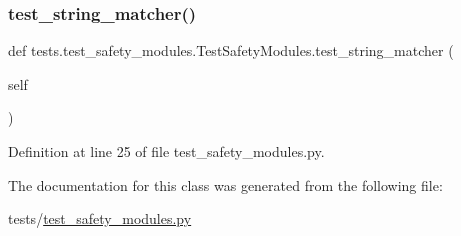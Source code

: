 \mbox{\label{classtests_1_1test__safety__modules_1_1TestSafetyModules_aed1e2df090eb0fd87202030400adf2a3}} 
\subsubsection{\texorpdfstring{test\+\_\+string\+\_\+matcher()}{test\_string\_matcher()}}
{\footnotesize\ttfamily def tests.\+test\+\_\+safety\+\_\+modules.\+Test\+Safety\+Modules.\+test\+\_\+string\+\_\+matcher (\begin{DoxyParamCaption}\item[{}]{self }\end{DoxyParamCaption})}



Definition at line 25 of file test\+\_\+safety\+\_\+modules.\+py.



The documentation for this class was generated from the following file\+:\begin{DoxyCompactItemize}
\item 
tests/\hyperlink{test__safety__modules_8py}{test\+\_\+safety\+\_\+modules.\+py}\end{DoxyCompactItemize}
